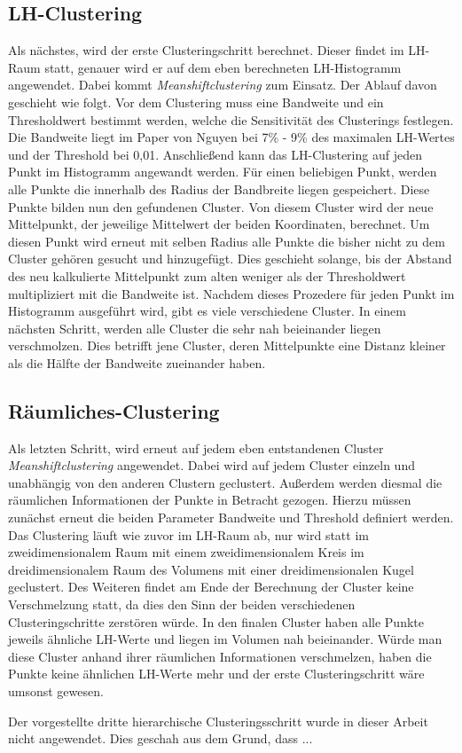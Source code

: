 \subsection{LH-Clustering}

Als nächstes, wird der erste Clusteringschritt berechnet. Dieser findet im LH-Raum statt, genauer wird er auf dem eben berechneten LH-Histogramm angewendet. Dabei kommt \textit{Meanshiftclustering} zum Einsatz. Der Ablauf davon geschieht wie folgt.
Vor dem Clustering muss eine Bandweite und ein Thresholdwert bestimmt werden, welche die Sensitivität des Clusterings festlegen. Die Bandweite liegt im Paper von Nguyen \cite{nguyen2012clustering} bei 7\% - 9\% des maximalen LH-Wertes und der Threshold bei 0,01. Anschließend kann das LH-Clustering auf jeden Punkt im Histogramm angewandt werden.
\newline
Für einen beliebigen Punkt, werden alle Punkte die innerhalb des Radius der Bandbreite liegen gespeichert. Diese Punkte bilden nun den gefundenen Cluster. Von diesem Cluster wird der neue Mittelpunkt, der jeweilige Mittelwert der beiden Koordinaten, berechnet. Um diesen Punkt wird erneut mit selben Radius alle Punkte die bisher nicht zu dem Cluster gehören gesucht und hinzugefügt. Dies geschieht solange, bis der Abstand des neu kalkulierte Mittelpunkt zum alten weniger als der Thresholdwert multipliziert mit die Bandweite ist. 
Nachdem dieses Prozedere für jeden Punkt im Histogramm ausgeführt wird, gibt es viele verschiedene Cluster. In einem nächsten Schritt, werden alle Cluster die sehr nah beieinander liegen verschmolzen. Dies betrifft jene Cluster, deren Mittelpunkte eine Distanz kleiner als die Hälfte der Bandweite zueinander haben.

\subsection{Räumliches-Clustering}

Als letzten Schritt, wird erneut auf jedem eben entstandenen Cluster \textit{Meanshiftclustering} angewendet. Dabei wird auf jedem Cluster einzeln und unabhängig von den anderen Clustern geclustert. Außerdem werden diesmal die räumlichen Informationen der Punkte in Betracht gezogen. Hierzu müssen zunächst erneut die beiden Parameter Bandweite und Threshold definiert werden. Das Clustering läuft wie zuvor im LH-Raum ab, nur wird statt im zweidimensionalem Raum mit einem zweidimensionalem Kreis im dreidimensionalem Raum des Volumens mit einer dreidimensionalen Kugel geclustert. Des Weiteren findet am Ende der Berechnung der Cluster keine Verschmelzung statt, da dies den Sinn der beiden verschiedenen Clusteringschritte zerstören würde. In den finalen Cluster haben alle Punkte jeweils ähnliche LH-Werte und liegen im Volumen nah beieinander. Würde man diese Cluster anhand ihrer räumlichen Informationen verschmelzen, haben die Punkte keine ähnlichen LH-Werte mehr und der erste Clusteringschritt wäre umsonst gewesen.






Der vorgestellte dritte hierarchische Clusteringsschritt wurde in dieser Arbeit nicht angewendet. Dies geschah aus dem Grund, dass ...

